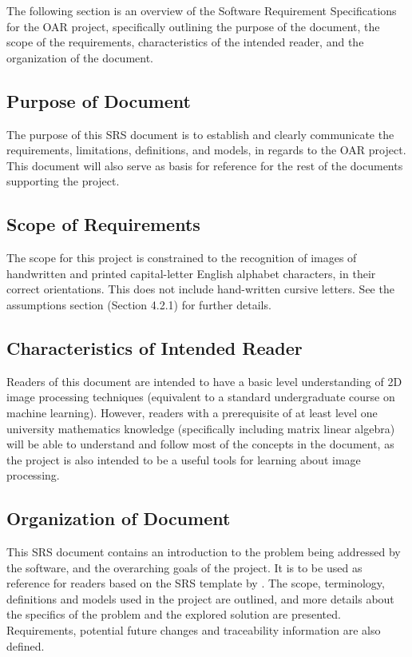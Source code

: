 \documentclass[12pt]{article}
\begin{document}
The following section is an overview of the Software Requirement Specifications for the OAR project, specifically outlining the 
purpose of the document, the scope of the requirements, characteristics of the intended reader, and the organization of the 
document.

\subsection{Purpose of Document}

The purpose of this SRS document is to establish and clearly communicate the requirements, limitations, definitions, and models, 
in regards to the OAR project. This document will also serve as basis for reference for the rest of the documents 
supporting the project. 

\subsection{Scope of Requirements} 

The scope for this project is constrained to the recognition of images of handwritten and printed capital-letter English
alphabet characters, in their correct orientations. This does not include hand-written cursive letters.
See the assumptions section (Section 4.2.1) for further details.

\subsection{Characteristics of Intended Reader} \label{sec_IntendedReader}

Readers of this document are intended to have a basic level understanding of 2D image 
processing techniques (equivalent to a standard undergraduate course on machine learning). However, readers with
a prerequisite of at least level one university mathematics knowledge (specifically including matrix linear algebra) will
be able to understand and follow most of the concepts in the document, as the project is also intended to be a useful tools
for learning about image processing.

\subsection{Organization of Document}

  This SRS document contains an introduction to the problem being addressed by the software,
  and the overarching goals of the project. It is to be used as reference for readers based on the
  SRS template by \citet{SmithAndLai2005, SmithEtAl2007}. The scope, terminology, definitions
  and models used in the project are outlined, and more details about the specifics of the problem and the explored
  solution are presented. Requirements, potential future changes and traceability information are also defined.
\end{document}

